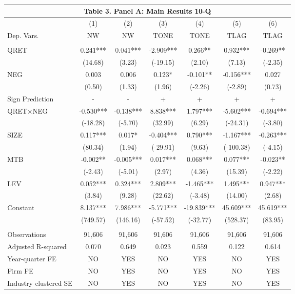 \begin{table}[htbp] \label{T3PA}
  \centering
    \begin{tabular}{lcccccc}
    \multicolumn{7}{c}{\textbf{Table 3. Panel A: Main Results 10-Q}} \\
    \midrule
      & (1) & (2) & (3) & (4) & (5) & (6) \\
    Dep. Vars. & NW & NW & TONE & TONE & TLAG & TLAG \\
    \midrule
      &   &   &   &   &   &  \\
    QRET & 0.241*** & 0.041*** & -2.909*** & 0.266** & 0.932*** & -0.269** \\
      & (14.68) & (3.23) & (-19.15) & (2.10) & (7.13) & (-2.35) \\
    NEG & 0.003 & 0.006 & 0.123* & -0.101** & -0.156*** & 0.027 \\
      & (0.50) & (1.33) & (1.96) & (-2.26) & (-2.89) & (0.73) \\
    \rowcolor[rgb]{ .933,  .925,  .882} Sign Prediction & - & - & + & + & + & + \\
    \rowcolor[rgb]{ .933,  .925,  .882} QRET$\times$NEG & -0.530*** & -0.138*** & 8.838*** & 1.797*** & -5.602*** & -0.694*** \\
    \rowcolor[rgb]{ .933,  .925,  .882}   & (-18.28) & (-5.70) & (32.99) & (6.29) & (-24.31) & (-3.80) \\
    SIZE & 0.117*** & 0.017* & -0.404*** & 0.790*** & -1.167*** & -0.263*** \\
      & (80.34) & (1.94) & (-29.91) & (9.63) & (-100.38) & (-4.15) \\
    MTB & -0.002** & -0.005*** & 0.017*** & 0.068*** & 0.077*** & -0.023** \\
      & (-2.43) & (-5.01) & (2.97) & (4.36) & (15.39) & (-2.22) \\
    LEV & 0.052*** & 0.324*** & 2.809*** & -1.465*** & 1.495*** & 0.947*** \\
      & (3.84) & (9.28) & (22.62) & (-3.48) & (14.00) & (2.68) \\
    Constant & 8.137*** & 7.986*** & -5.771*** & -19.839*** & 45.609*** & 45.619*** \\
      & (749.57) & (146.16) & (-57.52) & (-32.77) & (528.37) & (83.95) \\
      &   &   &   &   &   &  \\
    Observations & 91,606 & 91,606 & 91,606 & 91,606 & 91,606 & 91,606 \\
    Adjusted R-squared & 0.070 & 0.649 & 0.023 & 0.559 & 0.122 & 0.614 \\
    Year-quarter FE & NO & YES & NO & YES & NO & YES \\
    Firm FE & NO & YES & NO & YES & NO & YES \\
    Industry clustered SE & NO & YES & NO & YES & NO & YES \\
    \bottomrule
    \end{tabular}%
\end{table}%
